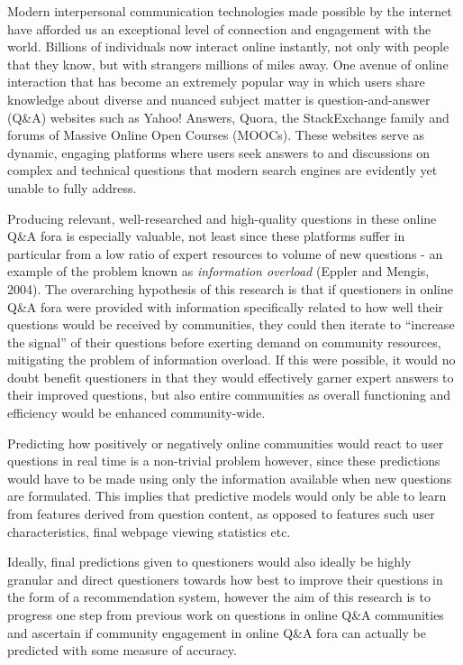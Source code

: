 \documentclass[11pt,preprint, authoryear]{article}
\numberwithin{equation}{section}
\begin{document}
Modern interpersonal communication technologies made possible by the
internet have afforded us an exceptional level of connection and
engagement with the world. Billions of individuals now interact online
instantly, not only with people that they know, but with strangers
millions of miles away. One avenue of online interaction that has become
an extremely popular way in which users share knowledge about diverse
and nuanced subject matter is question-and-answer (Q\&A) websites such
as Yahoo! Answers, Quora, the StackExchange family and forums of Massive
Online Open Courses (MOOCs). These websites serve as dynamic, engaging
platforms where users seek answers to and discussions on complex and
technical questions that modern search engines are evidently yet unable
to fully address.

Producing relevant, well-researched and high-quality questions in these
online Q\&A fora is especially valuable, not least since these platforms
suffer in particular from a low ratio of expert resources to volume of
new questions - an example of the problem known as \emph{information
overload} (Eppler and Mengis, 2004). The overarching hypothesis of this
research is that if questioners in online Q\&A fora were provided with
information specifically related to how well their questions would be
received by communities, they could then iterate to ``increase the
signal'' of their questions before exerting demand on community
resources, mitigating the problem of information overload. If this were
possible, it would no doubt benefit questioners in that they would
effectively garner expert answers to their improved questions, but also
entire communities as overall functioning and efficiency would be
enhanced community-wide.

Predicting how positively or negatively online communities would react
to user questions in real time is a non-trivial problem however, since
these predictions would have to be made using only the information
available when new questions are formulated. This implies that
predictive models would only be able to learn from features derived from
question content, as opposed to features such user characteristics,
final webpage viewing statistics etc.

Ideally, final predictions given to questioners would also ideally be
highly granular and direct questioners towards how best to improve their
questions in the form of a recommendation system, however the aim of
this research is to progress one step from previous work on questions in
online Q\&A communities and ascertain if community engagement in online
Q\&A fora can actually be predicted with some measure of accuracy.
\end{document}
